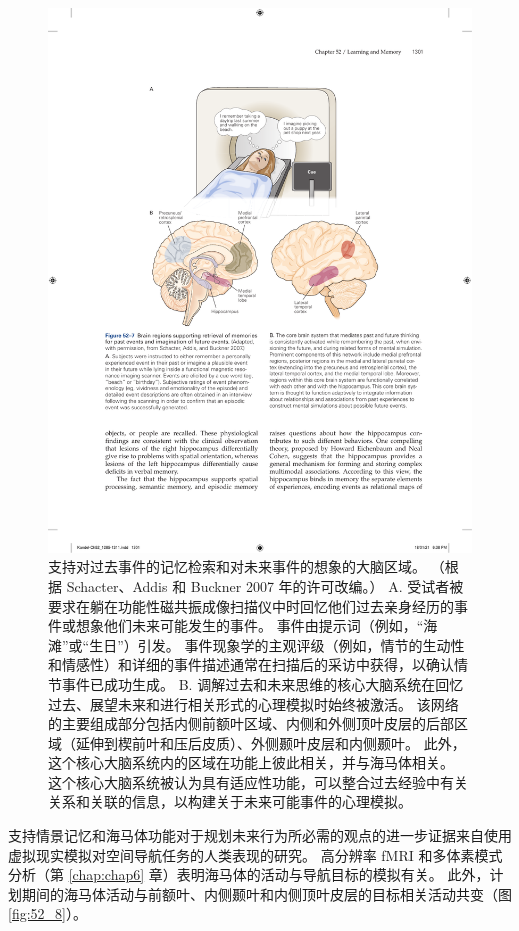 \begin{figure}[htbp]
	\centering
	\includegraphics[width=0.7\linewidth]{chap52/fig_52_7}
	\caption{支持对过去事件的记忆检索和对未来事件的想象的大脑区域。 （根据 Schacter、Addis 和 Buckner 2007 年的许可改编。） A. 受试者被要求在躺在功能性磁共振成像扫描仪中时回忆他们过去亲身经历的事件或想象他们未来可能发生的事件。 事件由提示词（例如，“海滩”或“生日”）引发。 事件现象学的主观评级（例如，情节的生动性和情感性）和详细的事件描述通常在扫描后的采访中获得，以确认情节事件已成功生成。 B. 调解过去和未来思维的核心大脑系统在回忆过去、展望未来和进行相关形式的心理模拟时始终被激活。 该网络的主要组成部分包括内侧前额叶区域、内侧和外侧顶叶皮层的后部区域（延伸到楔前叶和压后皮质）、外侧颞叶皮层和内侧颞叶。 此外，这个核心大脑系统内的区域在功能上彼此相关，并与海马体相关。 这个核心大脑系统被认为具有适应性功能，可以整合过去经验中有关关系和关联的信息，以构建关于未来可能事件的心理模拟。}
	\label{fig:52_7}
\end{figure}

支持情景记忆和海马体功能对于规划未来行为所必需的观点的进一步证据来自使用虚拟现实模拟对空间导航任务的人类表现的研究。 高分辨率 fMRI 和多体素模式分析（第 \ref{chap:chap6} 章）表明海马体的活动与导航目标的模拟有关。 此外，计划期间的海马体活动与前额叶、内侧颞叶和内侧顶叶皮层的目标相关活动共变（图 \ref{fig:52_8}）。

